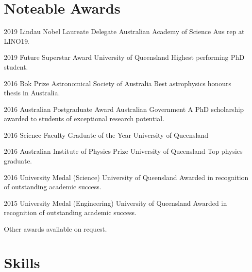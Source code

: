 \documentclass[11pt]{friggeri-cv}
\begin{document}
\section{Noteable Awards}
\begin{entrylist}
	\wentryInline
	{2019} %
	{Lindau Nobel Laureate Delegate}
	{Australian Academy of Science}
	{Aus rep at LINO19.}
\end{entrylist}
\begin{entrylist}
	\wentryInline
	{2019} %
	{Future Superstar Award}
	{University of Queensland}
	{Highest performing PhD student.}
\end{entrylist}
\begin{entrylist}
	\wentryInline
	{2016} %
	{Bok Prize}
	{Astronomical Society of Australia}
	{Best astrophysics honours thesis in Australia.}
\end{entrylist}
\begin{entrylist}
	\wentryInlineSmall
	{2016} %
	{Australian Postgraduate Award}
	{Australian Government}
	{A PhD scholarship awarded to students of exceptional research potential.}
\end{entrylist}
\begin{entrylist}
	\wentryInlineSmall
	{2016} %
	{Science Faculty Graduate of the Year}
	{University of Queensland}
	{}
\end{entrylist}
\begin{entrylist}
	\wentryInline
	{2016} %
	{Australian Institute of Physics Prize}
	{University of Queensland}
	{Top physics graduate.}
\end{entrylist}
\begin{entrylist}
	\wentryInlineSmall
	{2016} %
	{University Medal (Science)}
	{University of Queensland}
	{Awarded in recognition of outstanding academic success.}
\end{entrylist}
\begin{entrylist}
	\wentryInlineSmall
	{2015} %
	{University Medal (Engineering)}
	{University of Queensland}
	{Awarded in recognition of outstanding academic success.}
\end{entrylist}
\vspace{-5mm}

Other awards available on request.

\section{Skills}
\end{document}
